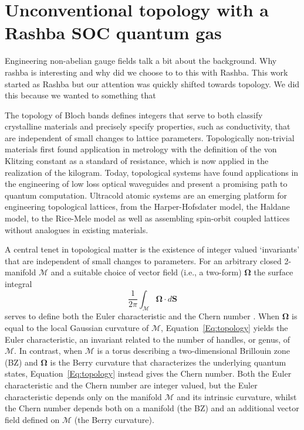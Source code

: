 
\renewcommand{\thechapter}{8}

\chapter{Unconventional topology with a Rashba SOC quantum gas}
\label{ch:Rashba}

Engineering non-abelian gauge fields 
talk a bit about the background. Why rashba is interesting and why did we choose to to this with Rashba. 
This work started as Rashba but our attention was quickly shifted towards topology. We did this because we wanted to something that 

The topology of Bloch bands defines integers that serve to both classify crystalline materials and precisely specify properties, such as conductivity, that are independent of small changes to lattice parameters\cite{hasan_colloquium:_2010}. Topologically non-trivial materials first found application in metrology with the definition of the von Klitzing constant as a standard of resistance, which is now applied in the realization of the kilogram\cite{newell_codata_2018}. Today, topological systems have found applications in the engineering of low loss optical waveguides\cite{ozawa_topological_2019} and present a promising path to quantum computation\cite{nayak_non-abelian_2008}. Ultracold atomic systems are an emerging platform for engineering topological lattices, from the Harper-Hofsdater model\cite{miyake_realizing_2013,aidelsburger_realization_2013}, the Haldane model\cite{jotzu_experimental_2014}, to the Rice-Mele model\cite{lu_geometrical_2016,lohse_thouless_2016} as well as assembling spin-orbit coupled lattices without analogues in existing materials\cite{wu_realization_2016,sun_highly_2018}.

A central tenet in topological matter is the existence of integer valued `invariants' that are independent of small changes to parameters. For an arbitrary closed 2-manifold $\mathcal{M}$ and a suitable choice of vector field (i.e., a two-form) $\mathbf{\Omega}$ the surface integral
%
\begin{equation}
	\frac{1}{2\pi}\int_{\mathcal{M}}\mathbf \Omega\cdot d\mathbf S
	\label{Eq:topology}
\end{equation}
%
serves to define both the Euler characteristic and the Chern number \cite{ozawa_topological_2019,cooper_topological_2019}. When $\mathbf{\Omega}$ is equal to the local Gaussian curvature of $\mathcal{M}$, Equation~\ref{Eq:topology} yields the Euler characteristic, an invariant related to the number of handles, or genus, of $\mathcal{M}$. In contrast, when $\mathcal{M}$ is a torus describing a two-dimensional Brillouin zone (BZ) and $\mathbf{\Omega}$ is the Berry curvature that characterizes the underlying quantum states, Equation~\ref{Eq:topology} instead gives the Chern number. Both the Euler characteristic and the Chern number are integer valued, but the Euler characteristic depends only on the manifold $\mathcal{M}$ and its intrinsic curvature, whilst the Chern number depends both on a manifold (the BZ) and an additional vector field defined on $\mathcal{M}$ (the Berry curvature). 



